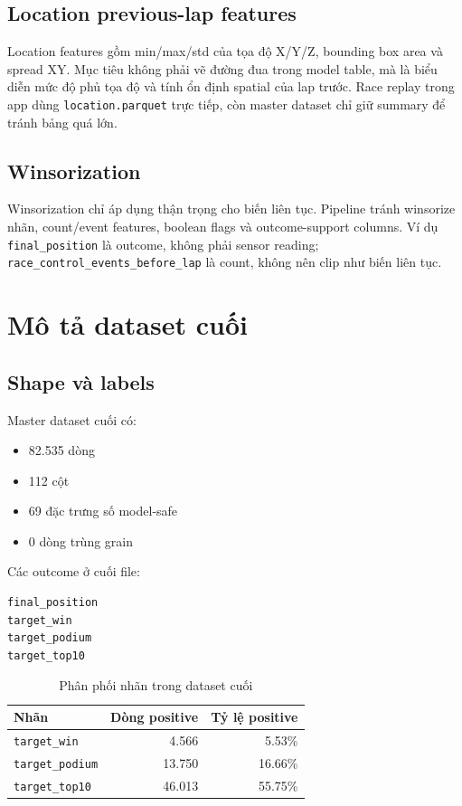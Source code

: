 \documentclass[conference]{IEEEtran}
\begin{document}
\subsection{Location previous-lap features}
Location features gồm min/max/std của tọa độ X/Y/Z, bounding box area và spread XY. Mục tiêu không phải vẽ đường đua trong model table, mà là biểu diễn mức độ phủ tọa độ và tính ổn định spatial của lap trước. Race replay trong app dùng \texttt{location.parquet} trực tiếp, còn master dataset chỉ giữ summary để tránh bảng quá lớn.

\subsection{Winsorization}
Winsorization chỉ áp dụng thận trọng cho biến liên tục. Pipeline tránh winsorize nhãn, count/event features, boolean flags và outcome-support columns. Ví dụ \texttt{final\_position} là outcome, không phải sensor reading; \texttt{race\_control\_events\_before\_lap} là count, không nên clip như biến liên tục.

\section{Mô tả dataset cuối}
\subsection{Shape và labels}
Master dataset cuối có:

\begin{itemize}
    \item 82.535 dòng
    \item 112 cột
    \item 69 đặc trưng số model-safe
    \item 0 dòng trùng grain
\end{itemize}

Các outcome ở cuối file:

\begin{lstlisting}
final_position
target_win
target_podium
target_top10
\end{lstlisting}

\begin{table}[htbp]
\caption{Phân phối nhãn trong dataset cuối}
\label{tab:targets}
\centering
\begin{tabular}{lrr}
\toprule
Nhãn & Dòng positive & Tỷ lệ positive \\
\midrule
\texttt{target\_win} & 4.566 & 5.53\% \\
\texttt{target\_podium} & 13.750 & 16.66\% \\
\texttt{target\_top10} & 46.013 & 55.75\% \\
\bottomrule
\end{tabular}
\end{table}
\end{document}

